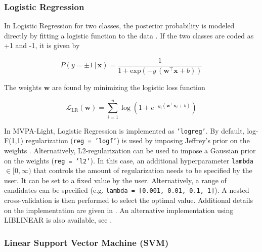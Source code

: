 \documentclass[utf8]{frontiersSCNS} %
\newcommand{\w}{\mathbf{w}}
\newcommand{\x}{\mathbf{x}}
\renewcommand{\L}{\mathcal{L}}
\newcommand{\ttt}[1]{\texttt{#1}}
\begin{document}
\subsubsection{Logistic Regression}

In Logistic Regression for two classes, the posterior probability is modeled directly by fitting a logistic function to the data \citep{Hastie2009}. If the two classes are coded as +1 and -1, it is given by

\begin{equation}
\label{eq:logreg_probability}
P(y = \pm 1\,|\,\x) = \frac{1}{1 + \text{exp}(-y\,(\w^\top\x + b))}
\end{equation}

The weights $\w$ are found by minimizing the logistic loss function

\begin{equation}
\label{eq:logreg_loss_function}
\L_\text{LR}(\w) = \sum_{i=1}^n \log(1 + e^{-y_i(\w^\top\x_i + b)})
\end{equation}

In MVPA-Light, Logistic Regression  is implemented as \texttt{'logreg'}. By default, log-F(1,1) regularization (\ttt{reg = 'logf'}) is used by imposing Jeffrey's prior on the weights \citep{Firth1993BiasEstimates,Rahman2017PerformanceData.,King2001}. Alternatively, L2-regularization can be used to impose a Gaussian prior on the weights (\ttt{reg = 'l2'}). In this case, an additional hyperparameter \ttt{lambda} $\in [0,\infty)$ that controls the amount of regularization needs to be specified by the user. It can be set to a fixed value by the user. Alternatively, a range of candidates can be specified (e.g. \ttt{lambda = [0.001, 0.01, 0.1, 1]}). A nested cross-validation is then performed to select the optimal value. Additional details on the implementation are given in . An alternative implementation using LIBLINEAR is also available, see .

\subsubsection{Linear Support Vector Machine (SVM)}
\end{document}
